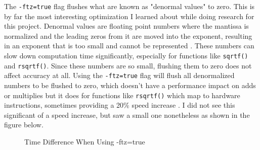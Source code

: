 \indent The \verb|-ftz=true| flag flushes what are known as "denormal values" to zero. This is by far the most interesting optimization I learned about while doing research for this project. Denormal values are floating point numbers where the mantissa is normalized and the leading zeros from it are moved into the exponent, resulting in an exponent that is too small and cannot be represented \cite{Harris_2013}. These numbers can slow down computation time significantly, especially for functions like \verb|sqrtf()| and \verb|rsqrtf()|. Since these numbers are so small, flushing them to zero does not affect accuracy at all. Using the \verb|-ftz=true| flag will flush all denormalized numbers to be flushed to zero, which doesn't have a performance impact on adds or multiplies but it does for functions like \verb|rsqrtf()| which map to hardware instructions, sometimes providing a 20\% speed increase \cite{Harris_2013}. I did not see this significant of a speed increase, but saw a small one nonetheless as shown in the figure below. 
\begin{figure}[H]
    \centering
    \caption{Time Difference When Using -ftz=true}
    \label{fig:ftz_moment}
\end{figure}

